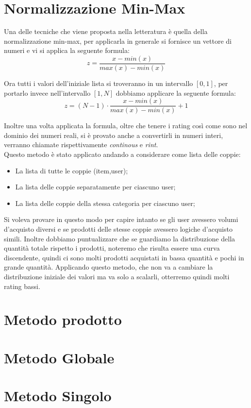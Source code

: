 \section{Normalizzazione Min-Max}
Una delle tecniche che viene proposta nella letteratura è quella della normalizzazione min-max, per applicarla in generale si fornisce un vettore di numeri e vi si applica la seguente formula:
$$z = \frac{x - min(x)}{max(x) - min(x)}$$

Ora tutti i valori dell'iniziale lista si troveranno in un intervallo $[0,1]$, per portarlo invece nell'intervallo $[1,N]$ dobbiamo applicare la seguente formula:
$$z = (N -1) \cdot \frac{x - min(x)}{max(x) - min(x)} + 1$$

Inoltre una volta applicata la formula, oltre che tenere i rating così come sono nel dominio dei numeri reali, si è provato anche a convertirli in numeri interi, verranno chiamate rispettivamente \textit{continous} e \textit{rint}.\\
Questo metodo è stato applicato andando a considerare come lista delle coppie:
\begin{itemize}
    \item La lista di tutte le coppie (item,user);
    \item La lista delle coppie separatamente per ciascuno user;
    \item La lista delle coppie della stessa categoria per ciascuno user;
\end{itemize}

Si voleva provare in questo modo per capire intanto se gli user avessero volumi d'acquisto diversi e se prodotti delle stesse coppie avessero logiche d'acquisto simili. 
Inoltre dobbiamo puntualizzare che se guardiamo la distribuzione della quantità totale rispetto i prodotti, noteremo che risulta essere una curva discendente, quindi ci sono molti prodotti acquistati in bassa quantità e pochi in grande quantità. Applicando questo metodo, che non va a cambiare la distribuzione iniziale dei valori ma va solo a scalarli, otterremo quindi molti rating bassi.
 
\section{Metodo prodotto}

\section{Metodo Globale}

\section{Metodo Singolo}